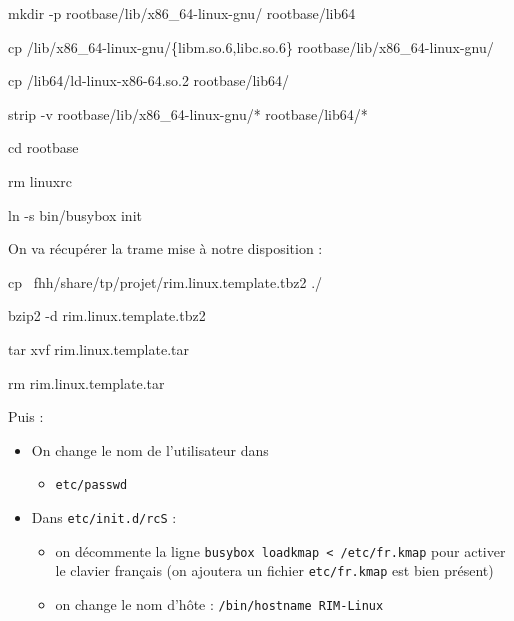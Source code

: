 \documentclass[]{article}
\newenvironment{Shaded}{}{}
\newcommand{\DataTypeTok}[1]{\textcolor[rgb]{0.56,0.13,0.00}{{#1}}}
\newcommand{\FunctionTok}[1]{\textcolor[rgb]{0.02,0.16,0.49}{{#1}}}
\newcommand{\BuiltInTok}[1]{{#1}}
\newcommand{\NormalTok}[1]{{#1}}
\providecommand{\tightlist}{%
  \setlength{\itemsep}{0pt}\setlength{\parskip}{0pt}}
\begin{document}
\begin{Shaded}
\begin{Highlighting}[]
\FunctionTok{mkdir} \NormalTok{-p rootbase/lib/x86_64-linux-gnu/ rootbase/lib64}

\FunctionTok{cp} \NormalTok{/lib/x86_64-linux-gnu/}\DataTypeTok{\{libm.so.6,libc.so.6\}} \NormalTok{rootbase/lib/x86_64-linux-gnu/}

\FunctionTok{cp} \NormalTok{/lib64/ld-linux-x86-64.so.2 rootbase/lib64/}


\FunctionTok{strip} \NormalTok{-v rootbase/lib/x86_64-linux-gnu/* rootbase/lib64/*}

\BuiltInTok{cd} \NormalTok{rootbase}

\FunctionTok{rm} \NormalTok{linuxrc}

\FunctionTok{ln} \NormalTok{-s bin/busybox init}
\end{Highlighting}
\end{Shaded}

On va récupérer la trame mise à notre disposition :

\begin{Shaded}
\begin{Highlighting}[]
\FunctionTok{cp} \NormalTok{~fhh/share/tp/projet/rim.linux.template.tbz2 ./}

\FunctionTok{bzip2} \NormalTok{-d rim.linux.template.tbz2}

\FunctionTok{tar} \NormalTok{xvf rim.linux.template.tar}

\FunctionTok{rm} \NormalTok{rim.linux.template.tar}
\end{Highlighting}
\end{Shaded}

Puis :

\begin{itemize}
\item
  On change le nom de l'utilisateur dans

  \begin{itemize}
  \tightlist
  \item
    \texttt{etc/passwd}
  \end{itemize}
\item
  Dans \texttt{etc/init.d/rcS} :

  \begin{itemize}
  \tightlist
  \item
    on décommente la ligne
    \texttt{busybox\ loadkmap\ \textless{}\ /etc/fr.kmap} pour activer
    le clavier français (on ajoutera un fichier \texttt{etc/fr.kmap} est
    bien présent)
  \item
    on change le nom d'hôte : \texttt{/bin/hostname\ RIM-Linux}
  \end{itemize}
\end{itemize}
\end{document}
